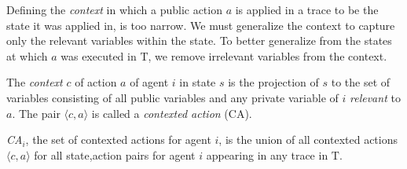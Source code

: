 \documentclass[runningheads]{llncs}
\newcommand{\eliran}[1]{\textbf{[\color{red}ELIRAN:#1]}}
\newcommand{\ronen}[1]{\textbf{[\color{blue}RONEN:#1]}}
\newcommand{\guy}[1]{\textbf{[\color{red}GUY:#1]}}
\newcommand{\cact}[1]{{\em CA$_#1$}}
\newcommand{\Tau}{\mathrm{T}}
\begin{document}
Defining the {\em context} in which a public action $a$ is applied in a trace to be the state it was applied in, is too narrow. We must generalize the context to capture only the relevant variables within the state.
To better generalize from the states at which $a$ was executed in $\Tau$, we remove irrelevant variables from the context. 
\begin{definition}
The {\em context} $c$ of action $a$ of agent $i$ in state $s$ is the projection of $s$ 
to the set of variables consisting of all public variables and any  private variable
of $i$  \emph{relevant} to $a$.
The pair $\langle c,a \rangle$ is called a {\em contexted action} (CA).

\cact{i}, the set of contexted actions for agent $i$, is the
union of all contexted actions $\langle c,a \rangle$ for all state,action pairs for agent $i$ appearing in any  trace in $\Tau$.
\end{definition}

\end{document}
